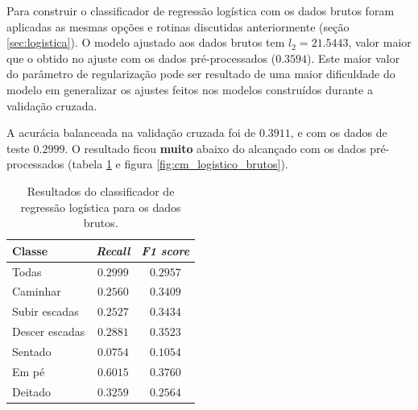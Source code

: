 \documentclass[final,5p]{elsarticle}
\numberwithin{equation}{section}
\begin{document}
        Para construir o classificador de regressão logística com os dados brutos foram aplicadas as mesmas opções e rotinas discutidas anteriormente (seção \ref{sec:logistica}). O modelo ajustado aos dados brutos tem $l_2 = 21.5443$, valor maior que o obtido no ajuste com os dados pré-processados ($0.3594$). Este maior valor do parâmetro de regularização pode ser resultado de uma maior dificuldade do modelo em generalizar os ajustes feitos nos modelos construídos durante a validação cruzada.

        A acurácia balanceada na validação cruzada foi de $0.3911$, e com os dados de teste $0.2999$. O resultado ficou \textbf{muito} abaixo do alcançado com os dados pré-processados (tabela \ref{tab:resultados_logistico_brutos} e figura \ref{fig:cm_logistico_brutos}).

        \begin{table}[h]
            \centering
            \begin{tabular}{l c c}
                \toprule
                \textbf{Classe} & \textbf{\emph{Recall}}  & \textbf{\emph{F1 score}} \\
                \midrule
                Todas & $0.2999$ & $0.2957$ \\
                \addlinespace
                Caminhar   & $0.2560$ & $0.3409$ \\
                Subir escadas   & $0.2527$ & $0.3434$ \\
                Descer escadas & $0.2881$ & $0.3523$ \\
                Sentado   & $0.0754$ & $0.1054$ \\
                Em pé  & $0.6015$ & $0.3760$ \\
                Deitado    & $0.3259$ & $0.2564$ \\
                \bottomrule
            \end{tabular}
            \caption{Resultados do classificador de regressão logística para os dados brutos.}
            \label{tab:resultados_logistico_brutos}
        \end{table}
\end{document}

